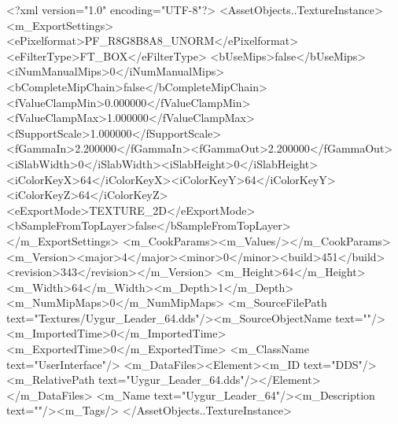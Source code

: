 <?xml version="1.0" encoding="UTF-8"?>
<AssetObjects..TextureInstance>
  <m_ExportSettings>
    <ePixelformat>PF_R8G8B8A8_UNORM</ePixelformat><eFilterType>FT_BOX</eFilterType>
    <bUseMips>false</bUseMips><iNumManualMips>0</iNumManualMips><bCompleteMipChain>false</bCompleteMipChain>
    <fValueClampMin>0.000000</fValueClampMin><fValueClampMax>1.000000</fValueClampMax><fSupportScale>1.000000</fSupportScale>
    <fGammaIn>2.200000</fGammaIn><fGammaOut>2.200000</fGammaOut><iSlabWidth>0</iSlabWidth><iSlabHeight>0</iSlabHeight>
    <iColorKeyX>64</iColorKeyX><iColorKeyY>64</iColorKeyY><iColorKeyZ>64</iColorKeyZ>
    <eExportMode>TEXTURE_2D</eExportMode><bSampleFromTopLayer>false</bSampleFromTopLayer>
  </m_ExportSettings>
  <m_CookParams><m_Values/></m_CookParams>
  <m_Version><major>4</major><minor>0</minor><build>451</build><revision>343</revision></m_Version>
  <m_Height>64</m_Height><m_Width>64</m_Width><m_Depth>1</m_Depth><m_NumMipMaps>0</m_NumMipMaps>
  <m_SourceFilePath text="Textures/Uygur_Leader_64.dds"/><m_SourceObjectName text=""/>
  <m_ImportedTime>0</m_ImportedTime><m_ExportedTime>0</m_ExportedTime>
  <m_ClassName text="UserInterface"/>
  <m_DataFiles><Element><m_ID text="DDS"/><m_RelativePath text="Uygur_Leader_64.dds"/></Element></m_DataFiles>
  <m_Name text="Uygur_Leader_64"/><m_Description text=""/><m_Tags/>
</AssetObjects..TextureInstance>
